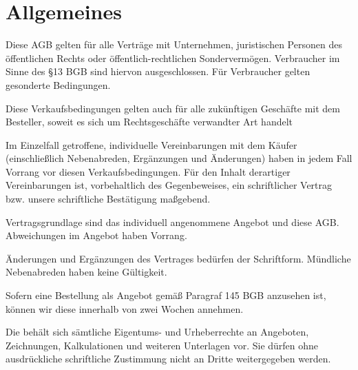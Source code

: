 \documentclass[fontsize=12pt,parskip=half]{scrartcl}
\author{}
\begin{document}

\subject{\large Allgemeine Geschäftsbedingungen - Geschäftskunden}
\title{\large \companyName}
\subtitle{\normalsize \companyLocation}
\date{\small \effDate}
\maketitle

\tableofcontents

\newpage

\section{Allgemeines}

\begin{contract}

\Clause[title={Geltungsbereich}]

Diese AGB gelten für alle Verträge mit Unternehmen, juristischen Personen des öffentlichen Rechts oder öffentlich-rechtlichen Sondervermögen. Verbraucher im Sinne des §13 BGB sind hiervon ausgeschlossen. Für Verbraucher gelten gesonderte Bedingungen.

Diese Verkaufsbedingungen gelten auch für alle zukünftigen Geschäfte mit dem Besteller, soweit es sich um Rechtsgeschäfte verwandter Art handelt 

Im Einzelfall getroffene, individuelle Vereinbarungen mit dem Käufer (einschließlich Nebenabreden, Ergänzungen und Änderungen) haben in jedem Fall Vorrang vor diesen Verkaufsbedingungen. Für den Inhalt derartiger Vereinbarungen ist, vorbehaltlich des Gegenbeweises, ein schriftlicher Vertrag bzw. unsere schriftliche Bestätigung maßgebend.

\Clause[title={Vertragsgrundlagen}]

Vertragsgrundlage sind das individuell angenommene Angebot und diese AGB. Abweichungen im Angebot haben Vorrang. 

Änderungen und Ergänzungen des Vertrages bedürfen der Schriftform. Mündliche Nebenabreden haben keine Gültigkeit.

Sofern eine Bestellung als Angebot gemäß Paragraf 145 BGB anzusehen ist, können wir diese innerhalb von zwei Wochen annehmen.

\Clause[title={Unterlagen und Rechte}]

Die \companyName{} behält sich sämtliche Eigentums- und Urheberrechte an Angeboten, Zeichnungen, Kalkulationen und weiteren Unterlagen vor. Sie dürfen ohne ausdrückliche schriftliche Zustimmung nicht an Dritte weitergegeben werden.


\end{contract}
\end{document}
